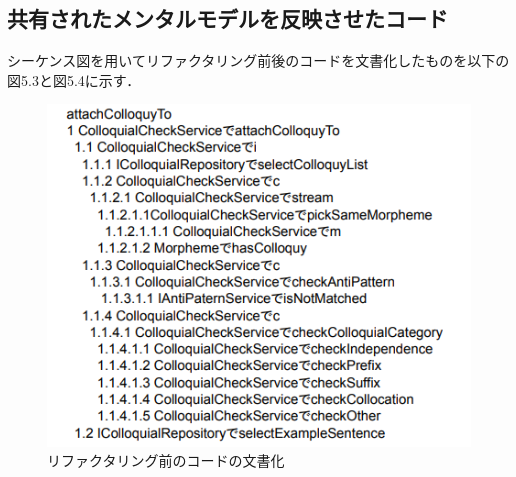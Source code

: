 \documentclass[12pt, a4paper]{jreport}
\begin{document}
\subsection{共有されたメンタルモデルを反映させたコード}
シーケンス図を用いてリファクタリング前後のコードを文書化したものを以下の図5.3と図5.4に示す．
\begin{figure}[H]
\centering
\includegraphics[width=1\linewidth]{image/modeiBe.png}
\caption{リファクタリング前のコードの文書化}
\label{fig:enter-label}
\end{figure}
\end{document}
